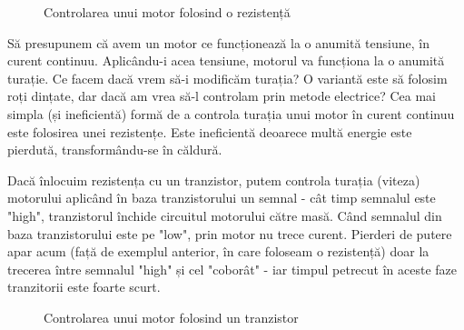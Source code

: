 \begin{figure}
    \vspace{-20pt}
    \vspace{-15pt}
    \caption{\label{fig:CodeWarrior-ResistenceMethod} Controlarea unui motor folosind o rezistență}
    \vspace{-10pt}
\end{figure}

Să presupunem că avem un motor ce funcționează la o anumită tensiune, în curent continuu. Aplicându-i acea tensiune, motorul va funcționa la o anumită turație. Ce facem dacă vrem să-i modificăm turația? O variantă este să folosim roți dințate, dar dacă am vrea să-l controlam prin metode electrice? Cea mai simpla (și ineficientă) formă de a controla turația unui motor în curent continuu este folosirea unei rezistențe. Este ineficientă deoarece multă energie este pierdută, transformându-se în căldură.

Dacă înlocuim rezistența cu un tranzistor, putem controla turația (viteza) motorului aplicând în baza tranzistorului un semnal - cât timp semnalul este "high", tranzistorul închide circuitul motorului către masă. Când semnalul din baza tranzistorului este pe "low", prin motor nu trece curent. Pierderi de putere apar acum (față de exemplul anterior, în care foloseam o rezistență) doar la trecerea între semnalul "high" și cel "coborât" - iar timpul petrecut în aceste faze tranzitorii este foarte scurt.

\begin{figure}
    \vspace{-60pt}
     \vspace{-15pt}
    \caption{\label{fig:CodeWarrior-TransistorMethod} Controlarea unui motor folosind un tranzistor}
    \vspace{-10pt}
\end{figure}

